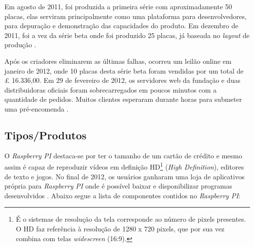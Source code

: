 \documentclass[
	12pt,				%
	openright,			%
	twoside,			%
	a4paper,			%
	chapter=TITLE,		%
	english,			%
	brazil				%
	]{abntex2}
\begin{document}
Em agosto de 2011, foi produzida a primeira série com aproximadamente 50 placas, elas serviram principalmente como uma plataforma para desenvolvedores, para depuração e demonstração das capacidades do produto. Em dezembro de 2011, foi a vez da série beta onde foi produzido 25 placas, já baseada no \textit{layout} de produção \cite{Werner.Raspberry}.

Após os criadores eliminarem as últimas falhas, ocorreu um leilão online em janeiro de 2012, onde 10 placas desta série beta foram vendidas por um total de £ 16.336,00. Em 29 de fevereiro de 2012, os servidores web da fundação e duas distribuidoras oficiais foram sobrecarregados em poucos minutos com a quantidade de pedidos. Muitos clientes esperaram durante horas para submeter uma pré-encomenda \cite{Werner.Raspberry}.


\subsection{Tipos/Produtos}


O \textit{Raspberry PI} destaca-se por ter o tamanho de um cartão de crédito e mesmo assim é capaz de reproduzir vídeos em definição HD\footnote{É o sistemas de resolução da tela corresponde ao número de pixels presentes. O HD faz referência à resolução de 1280 x 720 pixels, que por sua vez combina com telas \textit{widescreen} (16:9).} (\textit{High Definition}), editores de texto e jogos. No final de 2012, os usuários ganharam uma loja de aplicativos própria para \textit{Raspberry PI} onde é possível baixar e disponibilizar programas desenvolvidos \cite{revistagalileu}. Abaixo segue a lista de componentes contidos no \textit{Raspberry PI}:
\end{document}
